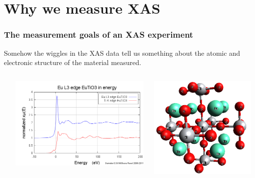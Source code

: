 \documentclass[10pt, xcolor=x11names, compress]{beamer}
\begin{document}
\section{Why we measure XAS}

\begin{frame}
  \frametitle{The measurement goals of an XAS experiment}

  Somehow the wiggles in the XAS data tell us something about the
  atomic and electronic structure of the material measured.

  \medskip

  \begin{columns}
    \begin{column}{0.125\linewidth}
      ~
    \end{column}
    \begin{column}{0.45\linewidth}
      \includegraphics[width=\linewidth]{images/eto_mu.png}
    \end{column}
    \begin{column}{0.30\linewidth}
      \includegraphics[width=\linewidth]{../ATEA/mds/eto.png}

\end{column}
\end{columns}
\end{frame}
\end{document}
